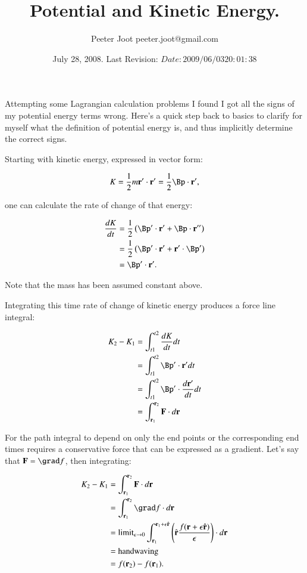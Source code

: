 \documentclass{article}      %
\title{ Potential and Kinetic Energy.}
\author{Peeter Joot \quad peeter.joot@gmail.com}
\date{ July 28, 2008.  Last Revision: $Date: 2009/06/03 20:01:38 $ }
\begin{document}
             

\maketitle{}

\section{}

Attempting some Lagrangian calculation problems I found I got all the signs of my potential energy terms wrong.  Here's a quick step back to basics to clarify for myself what the definition of potential energy is, and thus implicitly determine the correct signs.

Starting with kinetic energy, expressed in vector form:

\begin{equation*}
K 
= \inv{2} m \Br' \cdot \Br' 
= \inv{2} \Bp \cdot \Br',
\end{equation*}

one can calculate the rate of change of that energy:

\begin{align*}
\frac{dK }{dt}
&= \inv{2} \left(\Bp' \cdot \Br' + \Bp \cdot \Br''\right) \\
&= \inv{2} \left(\Bp' \cdot \Br' + \Br' \cdot \Bp'\right) \\
&= \Bp' \cdot \Br'.
\end{align*}

Note that the mass has been assumed constant above.

Integrating this time rate of change of kinetic energy produces a force
line 
integral:

\begin{align*}
K_2 - K_1 
&= \int_{t1}^{t2} \frac{dK}{dt} dt \\
&= \int_{t1}^{t2} \Bp' \cdot \Br' dt \\
&= \int_{t1}^{t2} \Bp' \cdot \frac{d\Br'}{dt} dt \\
&= \int_{\Br_1}^{\Br_2} \BF \cdot d\Br
\end{align*}

For the path integral to depend on only the end points or the corresponding end times requires a conservative force that can be expressed as a gradient.
Let's say that $\BF = \grad f$, then integrating:

\begin{align*}
K_2 - K_1 
&= \int_{\Br_1}^{\Br_2} \BF \cdot d\Br \\
&= \int_{\Br_1}^{\Br_2} \grad f \cdot d\Br \\
&= {\text{limit}}_{\epsilon \rightarrow 0} \int_{\Br_1}^{\Br_1 + \epsilon\rcap}
   \left(\rcap \frac{f(\Br + \epsilon \rcap)}{\epsilon}\right)
      \cdot d\Br \\
&= \text{handwaving} \\
&= f(\Br_2) - f(\Br_1).
\end{align*}
\end{document}
